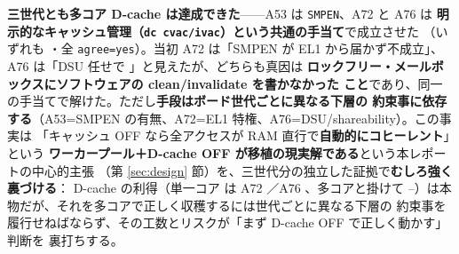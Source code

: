 \noindent
\textbf{三世代とも多コア D-cache は達成できた}——A53 は \texttt{SMPEN}、A72 と A76 は
\textbf{明示的なキャッシュ管理（\texttt{dc cvac/ivac}）という共通の手当て}で成立させた
（いずれも  ・全 \texttt{agree=yes}）。当初 A72 は「SMPEN が
EL1 から届かず不成立」、A76 は「DSU 任せで 」と見えたが、どちらも真因は
\textbf{ロックフリー・メールボックスにソフトウェアの clean/invalidate を書かなかった
こと}であり、同一の手当てで解けた。ただし\textbf{手段はボード世代ごとに異なる下層の
約束事に依存する}（A53=SMPEN の有無、A72=EL1 特権、A76=DSU/shareability）。この事実は
「キャッシュ OFF なら全アクセスが RAM 直行で\textbf{自動的にコヒーレント}」という
\textbf{ワーカープール＋D-cache OFF が移植の現実解である}という本レポートの中心的主張
（第 \ref{sec:design} 節）を、三世代分の独立した証拠で\textbf{むしろ強く裏づける}：
D-cache の利得（単一コア  は A72 ／A76 、多コアと掛けて
--）は本物だが、それを多コアで正しく収穫するには世代ごとに異なる下層の
約束事を履行せねばならず、その工数とリスクが「まず D-cache OFF で正しく動かす」判断を
裏打ちする。
